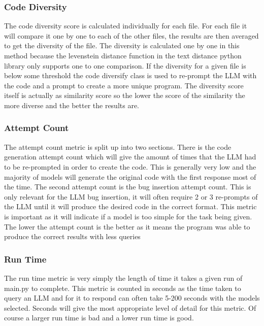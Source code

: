 \documentclass[12pt]{extarticle}
\begin{document}
\subsubsection{Code Diversity}

The code diversity score is calculated individually for each file. For each file it will compare it one by one to each of the other files, the results are then averaged to get the diversity of the file. The diversity is calculated one by one in this method because the levenstein distance function in the text distance python library only supports one to one comparison. If the diversity for a given file is below some threshold the code diversify class is used to re-prompt the LLM with the code and a prompt to create a more unique program. The diversity score itself is actually as similarity score so the lower the score of the similarity the more diverse and the better the results are.

\subsubsection{Attempt Count}

The attempt count metric is split up into two sections. There is the code generation attempt count which will give the amount of times that the LLM had to be re-prompted in order to create the code. This is generally very low and the majority of models will generate the original code with the first response most of the time. The second attempt count is the bug insertion attempt count. This is only relevant for the LLM bug insertion, it will often require 2 or 3 re-prompts of the LLM until it will produce the desired code in the correct format. This metric is important as it will indicate if a model is too simple for the task being given. The lower the attempt count is the better as it means the program was able to produce the correct results with less queries

\subsubsection{Run Time}

The run time metric is very simply the length of time it takes a given run of main.py to complete. This metric is counted in seconds as the time taken to query an LLM and for it to respond can often take 5-200 seconds with the models selected. Seconds will give the most appropriate level of detail for this metric. Of course a larger run time is bad and a lower run time is good.
\newpage
\end{document}
